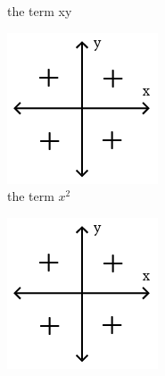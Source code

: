 \begin{figure}[ht]
\begin{subfigure}{.25\textwidth}
  \caption{the term xy}
  \label{fig:sign-xy}
\end{subfigure}
\begin{subfigure}{.25\textwidth}
  \centering
  \includegraphics[width=0.9\linewidth]{Pictures/signs-in-quadrants-all-plus-cropped.png}
  \caption{the term $x^2$}
  \label{fig:sign-x2}
\end{subfigure}
\begin{subfigure}{.25\textwidth}
  \centering
  \includegraphics[width=0.9\linewidth]{Pictures/signs-in-quadrants-all-plus-cropped.png}

\end{subfigure}
\end{figure}
